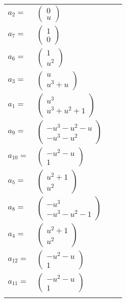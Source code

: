\documentclass[1p]{elsarticle_modified}
\theoremstyle{definition}
\begin{document}
\begin{tabular}{m{7pt} m{180pt} m{7pt} m{180pt} }
\flushright $a_{2}=$&$\begin{pmatrix}0\\u\end{pmatrix}$ \\
\flushright $a_{7}=$&$\begin{pmatrix}1\\0\end{pmatrix}$ \\
\flushright $a_{6}=$&$\begin{pmatrix}1\\u^2\end{pmatrix}$ \\
\flushright $a_{3}=$&$\begin{pmatrix}u\\u^3+u\end{pmatrix}$ \\
\flushright $a_{1}=$&$\begin{pmatrix}u^3\\u^3+u^2+1\end{pmatrix}$ \\
\flushright $a_{9}=$&$\begin{pmatrix}- u^3- u^2- u\\- u^3- u^2\end{pmatrix}$ \\
\flushright $a_{10}=$&$\begin{pmatrix}- u^2- u\\1\end{pmatrix}$ \\
\flushright $a_{5}=$&$\begin{pmatrix}u^2+1\\u^2\end{pmatrix}$ \\
\flushright $a_{8}=$&$\begin{pmatrix}- u^3\\- u^3- u^2-1\end{pmatrix}$ \\
\flushright $a_{4}=$&$\begin{pmatrix}u^2+1\\u^2\end{pmatrix}$ \\
\flushright $a_{12}=$&$\begin{pmatrix}- u^2- u\\1\end{pmatrix}$ \\
\flushright $a_{11}=$&$\begin{pmatrix}- u^2- u\\1\end{pmatrix}$\\&\end{tabular}
\end{document}
